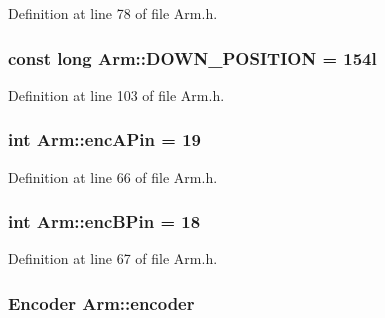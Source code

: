 Definition at line 78 of file Arm.\-h.

\hypertarget{classArm_a3a95b43d43f1e4858829ff474555f81f}{
\subsubsection[{D\-O\-W\-N\-\_\-\-P\-O\-S\-I\-T\-I\-O\-N}]{\setlength{\rightskip}{0pt plus 5cm}const long Arm\-::\-D\-O\-W\-N\-\_\-\-P\-O\-S\-I\-T\-I\-O\-N = 154l\hspace{0.3cm}{\ttfamily [private]}}}\label{classArm_a3a95b43d43f1e4858829ff474555f81f}


Definition at line 103 of file Arm.\-h.

\hypertarget{classArm_ad36ceeef302fda4b8e162feae7961c41}{
\subsubsection[{enc\-A\-Pin}]{\setlength{\rightskip}{0pt plus 5cm}int Arm\-::enc\-A\-Pin = 19\hspace{0.3cm}{\ttfamily [private]}}}\label{classArm_ad36ceeef302fda4b8e162feae7961c41}


Definition at line 66 of file Arm.\-h.

\hypertarget{classArm_ab1111e111610b38214e703cd88887f24}{
\subsubsection[{enc\-B\-Pin}]{\setlength{\rightskip}{0pt plus 5cm}int Arm\-::enc\-B\-Pin = 18\hspace{0.3cm}{\ttfamily [private]}}}\label{classArm_ab1111e111610b38214e703cd88887f24}


Definition at line 67 of file Arm.\-h.

\hypertarget{classArm_afe912e5b20439c082abb66920658805c}{
\subsubsection[{encoder}]{\setlength{\rightskip}{0pt plus 5cm}Encoder Arm\-::encoder\hspace{0.3cm}{\ttfamily [private]}}}\label{classArm_afe912e5b20439c082abb66920658805c}


